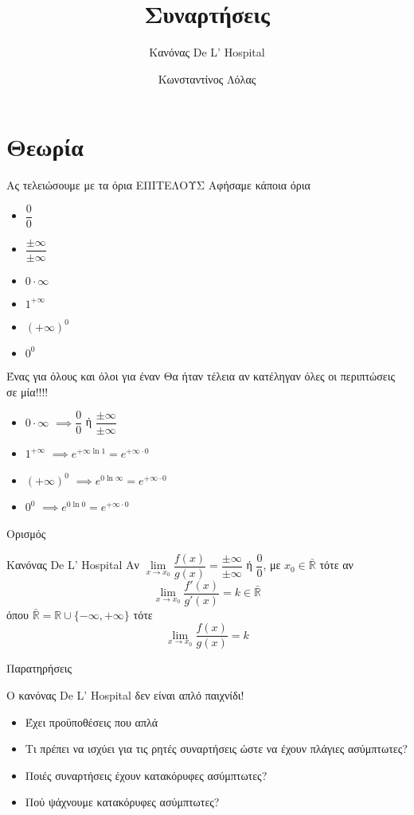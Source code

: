 \documentclass[greek]{beamer}
\title{Συναρτήσεις}
\subtitle{Κανόνας De L' Hospital}
\author[Λόλας]{Κωνσταντίνος Λόλας}
\date{}
\begin{document}
\begin{frame}
 \titlepage
\end{frame}

\section{Θεωρία}
\begin{frame}{Ας τελειώσουμε με τα όρια ΕΠΙΤΕΛΟΥΣ}
 Αφήσαμε κάποια όρια
 \begin{itemize}
  \item $\dfrac{0}{0}$
  \item $\dfrac{\pm\infty}{\pm\infty}$
  \item $0\cdot \infty$
  \item $1^{+\infty}$
  \item $(+\infty)^0$
  \item $0^0$
 \end{itemize}
\end{frame}

\begin{frame}{Ένας για όλους και όλοι για έναν}
 Θα ήταν τέλεια αν κατέληγαν όλες οι περιπτώσεις σε μία!!!!
 \begin{itemize}
  \item<1-> $0\cdot \infty$ $\implies \dfrac{0}{0}$ ή $\dfrac{\pm\infty}{\pm\infty}$
  \item<3-> $1^{+\infty}$  $\implies e^{+\infty\ln 1}=e^{+\infty\cdot 0}$
  \item<5-> $(+\infty)^0$  $\implies e^{0\ln\infty}=e^{+\infty\cdot 0}$
  \item<7-> $0^0$  $\implies e^{0\ln 0}=e^{+\infty\cdot 0}$
 \end{itemize}
\end{frame}

\begin{frame}{Ορισμός}
 \begin{block}{Κανόνας De L' Hospital}
  Αν $\lim\limits_{x \to x_0}{ \dfrac{f(x)}{g(x)} }=\dfrac{\pm\infty}{\pm\infty}$ ή $\dfrac{0}{0}$, με $x_0\in\bar{\mathbb{R}}$ τότε αν
  $$\lim\limits_{x \to x_0}{ \dfrac{f'(x)}{g'(x)} }=k\in\bar{\mathbb{R}}$$
  όπου $\bar{\mathbb{R}}=\mathbb{R}\cup \{-\infty,+\infty\}$ τότε
  $$\lim\limits_{x \to x_0}{ \dfrac{f(x)}{g(x)} }=k$$
 \end{block}
\end{frame}

\begin{frame}{Παρατηρήσεις}

 Ο κανόνας De L' Hospital δεν είναι απλό παιχνίδι!

 \begin{itemize}
  \item<1-> Έχει προϋποθέσεις που απλά
  \item<2-> Τι πρέπει να ισχύει για τις ρητές συναρτήσεις ώστε να έχουν πλάγιες ασύμπτωτες?
  \item<3-> Ποιές συναρτήσεις έχουν κατακόρυφες ασύμπτωτες?
  \item<4-> Πού ψάχνουμε κατακόρυφες ασύμπτωτες?
 \end{itemize}

\end{frame}
\end{document}
